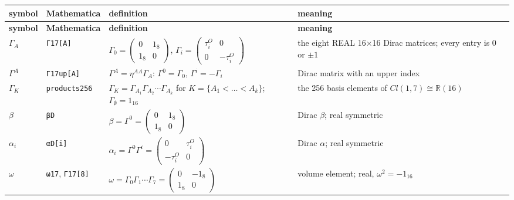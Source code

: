 \documentclass[10pt,a4paper]{article}
\begin{document}
{\small
\begin{longtable}{>{\raggedright\arraybackslash}p{}>{\raggedright\arraybackslash}p{}>{\raggedright\arraybackslash}p{}>{\raggedright\arraybackslash}p{}}
\toprule
\textbf{symbol} & \textbf{Mathematica} & \textbf{definition} & \textbf{meaning} \\
\midrule\endfirsthead
\toprule
\textbf{symbol} & \textbf{Mathematica} & \textbf{definition} & \textbf{meaning} \\
\midrule\endhead
\endfoot
\bottomrule\endlastfoot
$\Gamma_A$ & \texttt{Γ17[A]} & $\Gamma_0=\left(\begin{smallmatrix}0&1_8\\1_8&0\end{smallmatrix}\right)$, $\Gamma_i=\left(\begin{smallmatrix}\tau^{O}_i&0\\0&-\tau^{O}_i\end{smallmatrix}\right)$ & the eight REAL 16×16 Dirac matrices; every entry is $0$ or $\pm1$ \\
$\Gamma^A$ & \texttt{Γ17up[A]} & $\Gamma^A=\eta^{AA}\Gamma_A$: $\Gamma^0=\Gamma_0$, $\Gamma^i=-\Gamma_i$ & Dirac matrix with an upper index \\
$\Gamma_K$ & \texttt{products256} & $\Gamma_K=\Gamma_{A_1}\Gamma_{A_2}\cdots\Gamma_{A_k}$ for $K=\lbrace A_1<\dots<A_k\rbrace$; $\Gamma_\emptyset=1_{16}$ & the 256 basis elements of $Cl(1,7)\cong\mathbb R(16)$ \\
$\beta$ & \texttt{βD} & $\beta=\Gamma^0=\left(\begin{smallmatrix}0&1_8\\1_8&0\end{smallmatrix}\right)$ & Dirac $\beta$; real symmetric \\
$\alpha_i$ & \texttt{αD[i]} & $\alpha_i=\Gamma^0\Gamma^i=\left(\begin{smallmatrix}0&\tau^{O}_i\\-\tau^{O}_i&0\end{smallmatrix}\right)$ & Dirac $\alpha$; real symmetric \\
$\omega$ & \texttt{ω17}, \texttt{Γ17[8]} & $\omega=\Gamma_0\Gamma_1\cdots\Gamma_7=\left(\begin{smallmatrix}0&-1_8\\1_8&0\end{smallmatrix}\right)$ & volume element; real, $\omega^2=-1_{16}$ \\

\end{longtable}}
\end{document}
